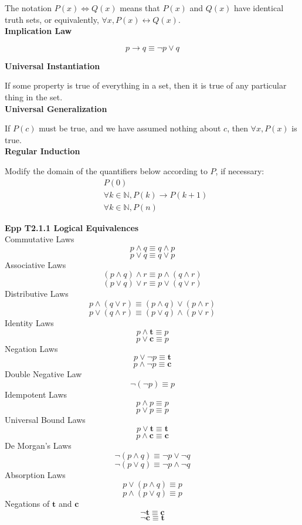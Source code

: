\documentclass[a4paper]{article}
\newcommand{\subheading}[1]{{\scriptsize\textbf{#1}}}
\begin{document}
\begin{multicols*}{4}
The notation $P(x) \iff Q(x)$ means that $P(x)$ and $Q(x)$ have identical truth
sets, or equivalently, $\forall x, P(x) \leftrightarrow Q(x)$.\\

\subheading{Implication Law}

$$p \rightarrow q \equiv \neg p \lor q$$

\subheading{Universal Instantiation}

If some property is true of everything in a set, then it is true of any
particular thing in the set.\\

\subheading{Universal Generalization}

If $P(c)$ must be true, and we have assumed nothing about $c$, then $\forall x,
P(x)$ is true.\\

\subheading{Regular Induction}

Modify the domain of the quantifiers below according to $P$, if necessary:
\begin{eqnarray*}
  &P(0) \\
  &\forall k \in \mathbb{N}, P(k) \rightarrow P(k+1) \\
  &\forall k \in \mathbb{N}, P(n)
\end{eqnarray*}

\subheading{Epp T2.1.1 Logical Equivalences}\\
Commutative Laws
  $$ p \land q \equiv q \land p $$
  $$ p \lor  q \equiv q \lor  p $$
Associative Laws
  $$ (p \land q) \land r \equiv p \land (q \land r) $$
  $$ (p \lor  q) \lor  r \equiv p \lor  (q \lor  r) $$
Distributive Laws
  $$ p \land (q \lor  r) \equiv (p \land q) \lor  (p \land r) $$
  $$ p \lor  (q \land r) \equiv (p \lor  q) \land (p \lor  r) $$
Identity Laws
  $$ p \land \textbf{t} \equiv p $$
  $$ p \lor  \textbf{c} \equiv p $$
Negation Laws
  $$ p \lor  \neg p \equiv \textbf{t} $$
  $$ p \land \neg p \equiv \textbf{c} $$
Double Negative Law
  $$ \neg ( \neg p ) \equiv p $$
Idempotent Laws
  $$ p \land p \equiv p $$
  $$ p \lor  p \equiv p $$
Universal Bound Laws
  $$ p \lor  \textbf{t} \equiv \textbf{t} $$
  $$ p \land \textbf{c} \equiv \textbf{c} $$
De Morgan's Laws
  $$ \neg ( p \land q ) \equiv \neg p \lor  \neg q $$
  $$ \neg ( p \lor  q ) \equiv \neg p \land \neg q $$
Absorption Laws
  $$ p \lor  (p \land q) \equiv p $$
  $$ p \land (p \lor  q) \equiv p $$
Negations of $\textbf{t}$ and $\textbf{c}$
  $$ \neg \textbf{t} \equiv \textbf{c} $$
  $$ \neg \textbf{c} \equiv \textbf{t} $$


\end{multicols*}
\end{document}
